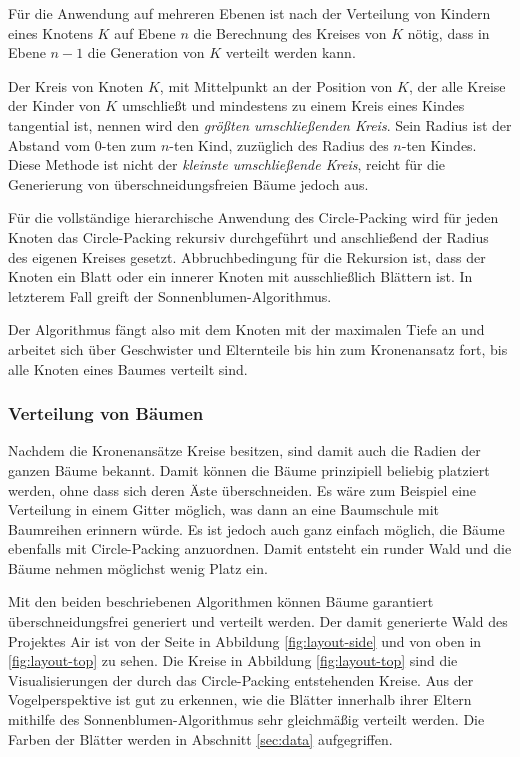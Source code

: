 Für die Anwendung auf mehreren Ebenen ist nach der Verteilung von Kindern eines Knotens $K$ auf Ebene $n$ die Berechnung des Kreises von $K$ nötig, dass in Ebene $n - 1$ die Generation von $K$ verteilt werden kann.

Der Kreis von Knoten $K$, mit Mittelpunkt an der Position von $K$, der alle Kreise der Kinder von $K$ umschließt und mindestens zu einem Kreis eines Kindes tangential ist, nennen wird den \textit{größten umschließenden Kreis}. Sein Radius ist der Abstand vom $0$-ten zum $n$-ten Kind, zuzüglich des Radius des $n$-ten Kindes. Diese Methode ist nicht der \textit{kleinste umschließende Kreis}, reicht für die Generierung von überschneidungsfreien Bäume jedoch aus.

Für die vollständige hierarchische Anwendung des Circle-Packing wird für jeden Knoten das Circle-Packing rekursiv durchgeführt und anschließend der Radius des eigenen Kreises gesetzt. Abbruchbedingung für die Rekursion ist, dass der Knoten ein Blatt oder ein innerer Knoten mit ausschließlich Blättern ist. In letzterem Fall greift der Sonnenblumen-Algorithmus.

Der Algorithmus fängt also mit dem Knoten mit der maximalen Tiefe an und arbeitet sich über Geschwister und Elternteile bis hin zum Kronenansatz fort, bis alle Knoten eines Baumes verteilt sind.

\subsubsection*{Verteilung von Bäumen}


Nachdem die Kronenansätze Kreise besitzen, sind damit auch die Radien der ganzen Bäume bekannt. Damit können die Bäume prinzipiell beliebig platziert werden, ohne dass sich deren Äste überschneiden. Es wäre zum Beispiel eine Verteilung in einem Gitter möglich, was dann an eine Baumschule mit Baumreihen erinnern würde. Es ist jedoch auch ganz einfach möglich, die Bäume ebenfalls mit Circle-Packing anzuordnen. Damit entsteht ein runder Wald und die Bäume nehmen möglichst wenig Platz ein.

Mit den beiden beschriebenen Algorithmen können Bäume garantiert überschneidungsfrei generiert und verteilt werden. Der damit generierte Wald des Projektes Air ist von der Seite in Abbildung \ref{fig:layout-side} und von oben in \ref{fig:layout-top} zu sehen. Die Kreise in Abbildung \ref{fig:layout-top} sind die Visualisierungen der durch das Circle-Packing entstehenden Kreise. Aus der Vogelperspektive ist gut zu erkennen, wie die Blätter innerhalb ihrer Eltern mithilfe des Sonnenblumen-Algorithmus sehr gleichmäßig verteilt werden. Die Farben der Blätter werden in Abschnitt \ref{sec:data} aufgegriffen.

